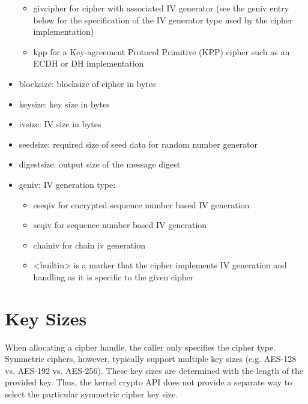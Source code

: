 \documentclass[a4paper,8pt,english]{sphinxmanual}
\begin{document}
\begin{itemize}
\begin{itemize}
\item {} 
givcipher for cipher with associated IV generator (see the geniv
entry below for the specification of the IV generator type used by
the cipher implementation)

\item {} 
kpp for a Key-agreement Protocol Primitive (KPP) cipher such as
an ECDH or DH implementation

\end{itemize}

\item {} 
blocksize: blocksize of cipher in bytes

\item {} 
keysize: key size in bytes

\item {} 
ivsize: IV size in bytes

\item {} 
seedsize: required size of seed data for random number generator

\item {} 
digestsize: output size of the message digest

\item {} 
geniv: IV generation type:
\begin{itemize}
\item {} 
eseqiv for encrypted sequence number based IV generation

\item {} 
seqiv for sequence number based IV generation

\item {} 
chainiv for chain iv generation

\item {} 
\textless{}builtin\textgreater{} is a marker that the cipher implements IV generation and
handling as it is specific to the given cipher

\end{itemize}

\end{itemize}


\section{Key Sizes}
\label{crypto/architecture:key-sizes}
When allocating a cipher handle, the caller only specifies the cipher
type. Symmetric ciphers, however, typically support multiple key sizes
(e.g. AES-128 vs. AES-192 vs. AES-256). These key sizes are determined
with the length of the provided key. Thus, the kernel crypto API does
not provide a separate way to select the particular symmetric cipher key
size.
\end{document}
